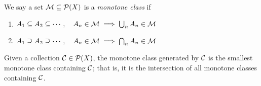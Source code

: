 \begin{definition}
    We say a set $\cal{M} \subseteq \cal{P}(X)$ is a \emph{monotone class} if
    \begin{enumerate}
        \item $A_1 \subseteq A_2 \subseteq \cdots,\quad A_n \in \cal{M} \implies \bigcup_{n} A_n \in \cal{M}$
        \item $A_1 \supseteq A_2 \supseteq \cdots,\quad A_n \in \cal{M} \implies \bigcap_{n} A_n \in \cal{M}$
    \end{enumerate} 
\end{definition}

Given a collection $\cal{C} \in \cal{P}(X)$, the monotone class generated by $\cal{C}$ is the smallest monotone class containing $\cal{C}$; that is, it is the intersection of all monotone classes containing $\cal{C}$. 

